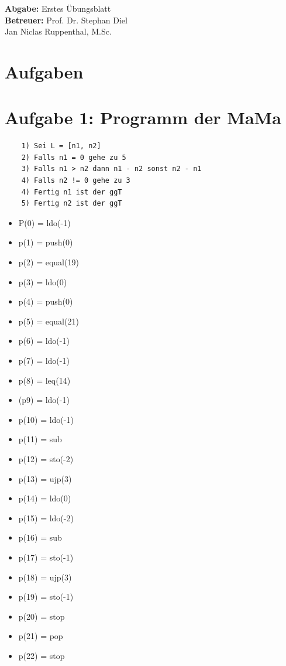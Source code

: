 \documentclass[11pt,a4paper]{article}
\title{\course}
\author{\studentname\\Matrikelnummer: \studentnumber\\\institute}
\date{\today}
\begin{document}
\maketitle

\begin{center}
    \textbf{Abgabe:} Erstes Übungsblatt \\
    \vspace{4mm}
    \textbf{Betreuer:} Prof. Dr. Stephan Diel \\ Jan Niclas Ruppenthal, M.Sc.
\end{center}

\bigskip

\section*{Aufgaben}

\section{Aufgabe 1: Programm der MaMa}
\begin{verbatim}
    1) Sei L = [n1, n2]
    2) Falls n1 = 0 gehe zu 5
    3) Falls n1 > n2 dann n1 - n2 sonst n2 - n1
    4) Falls n2 != 0 gehe zu 3
    4) Fertig n1 ist der ggT
    5) Fertig n2 ist der ggT

\end{verbatim}
\begin{itemize}
    \item P(0) = ldo(-1)
    \item p(1) = push(0)
    \item p(2) = equal(19)
    \item p(3) = ldo(0)
    \item p(4) = push(0)
    \item p(5) = equal(21)
    \item p(6) = ldo(-1)
    \item p(7) = ldo(-1)
    \item p(8) = leq(14)
    \item (p9) = ldo(-1)
    \item p(10) = ldo(-1)
    \item p(11) = sub
    \item p(12) = sto(-2)
    \item p(13) = ujp(3)
    \item p(14) = ldo(0)
    \item p(15) = ldo(-2)
    \item p(16) = sub
    \item p(17) = sto(-1)
    \item p(18) = ujp(3)
    \item p(19) = sto(-1)
    \item p(20) = stop
    \item p(21) = pop
    \item p(22) = stop
\end{itemize}
\end{document}
